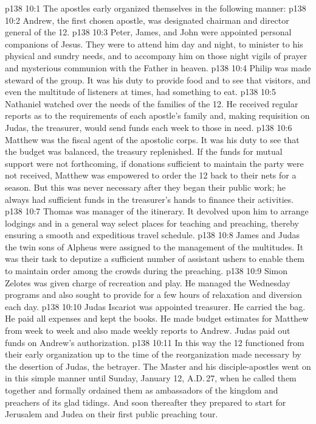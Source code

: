 \vs p138 10:1 The apostles early organized themselves in the following manner:
\vs p138 10:2 \bibnobreakspace Andrew, the first chosen apostle, was designated chairman and director general of the 12.
\vs p138 10:3 \bibnobreakspace Peter, James, and John were appointed personal companions of Jesus. They were to attend him day and night, to minister to his physical and sundry needs, and to accompany him on those night vigils of prayer and mysterious communion with the Father in heaven.
\vs p138 10:4 \bibnobreakspace Philip was made steward of the group. It was his duty to provide food and to see that visitors, and even the multitude of listeners at times, had something to eat.
\vs p138 10:5 \bibnobreakspace Nathaniel watched over the needs of the families of the 12. He received regular reports as to the requirements of each apostle’s family and, making requisition on Judas, the treasurer, would send funds each week to those in need.
\vs p138 10:6 \bibnobreakspace Matthew was the fiscal agent of the apostolic corps. It was his duty to see that the budget was balanced, the treasury replenished. If the funds for mutual support were not forthcoming, if donations sufficient to maintain the party were not received, Matthew was empowered to order the 12 back to their nets for a season. But this was never necessary after they began their public work; he always had sufficient funds in the treasurer’s hands to finance their activities.
\vs p138 10:7 \bibnobreakspace Thomas was manager of the itinerary. It devolved upon him to arrange lodgings and in a general way select places for teaching and preaching, thereby ensuring a smooth and expeditious travel schedule.
\vs p138 10:8 \bibnobreakspace James and Judas the twin sons of Alpheus were assigned to the management of the multitudes. It was their task to deputize a sufficient number of assistant ushers to enable them to maintain order among the crowds during the preaching.
\vs p138 10:9 \bibnobreakspace Simon Zelotes was given charge of recreation and play. He managed the Wednesday programs and also sought to provide for a few hours of relaxation and diversion each day.
\vs p138 10:10 \bibnobreakspace Judas Iscariot was appointed treasurer. He carried the bag. He paid all expenses and kept the books. He made budget estimates for Matthew from week to week and also made weekly reports to Andrew. Judas paid out funds on Andrew’s authorization.
\vs p138 10:11 \pc In this way the 12 functioned from their early organization up to the time of the reorganization made necessary by the desertion of Judas, the betrayer. The Master and his disciple\hyp{}apostles went on in this simple manner until Sunday, January 12, A.D.\,27, when he called them together and formally ordained them as ambassadors of the kingdom and preachers of its glad tidings. And soon thereafter they prepared to start for Jerusalem and Judea on their first public preaching tour.
\quizlink
